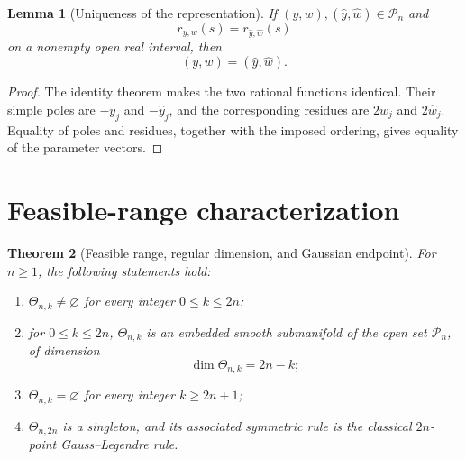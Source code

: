 \documentclass[preprint,12pt]{elsarticle}
\newtheorem{theorem}{Theorem}
\newtheorem{lemma}[theorem]{Lemma}
\theoremstyle{remark}
\begin{document}
\begin{lemma}[Uniqueness of the representation]
If \((y,w),(\widehat y,\widehat w)\in\mathcal P_n\) and
\[
r_{y,w}(s)=r_{\widehat y,\widehat w}(s)
\]
on a nonempty open real interval, then
\[
(y,w)=(\widehat y,\widehat w).
\]
\end{lemma}

\begin{proof}
The identity theorem makes the two rational functions identical. Their
simple poles are \(-y_j\) and \(-\widehat y_j\), and the corresponding
residues are \(2w_j\) and \(2\widehat w_j\). Equality of poles and
residues, together with the imposed ordering, gives equality of the
parameter vectors.
\end{proof}

\section{Feasible-range characterization}

\begin{theorem}[Feasible range, regular dimension, and Gaussian endpoint]
For \(n\geq1\), the following statements hold:
\begin{enumerate}[label=(\roman*)]
\item \(\Theta_{n,k}\neq\varnothing\) for every integer
\(0\leq k\leq2n\);
\item for \(0\leq k\leq2n\), \(\Theta_{n,k}\) is an embedded smooth
submanifold of the open set \(\mathcal P_n\), of dimension
\[
\dim\Theta_{n,k}=2n-k;
\]
\item \(\Theta_{n,k}=\varnothing\) for every integer \(k\geq2n+1\);
\item \(\Theta_{n,2n}\) is a singleton, and its associated symmetric
rule is the classical \(2n\)-point Gauss--Legendre rule.
\end{enumerate}
\end{theorem}
\end{document}
